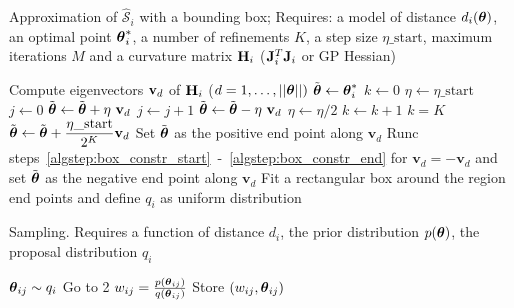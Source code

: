 \begin{algorithm}[!ht]
	\caption{Approximation of \(\mathcal{\hat{S}}_i\) with a bounding box; 
  Requires: a model of distance \(d_i(\boldsymbol{\theta})\), 
  an optimal point \(\boldsymbol{\theta}_i^*\), 
  a number of refinements \(K\), 
  a step size \(\eta\_\text{start}\), 
  maximum iterations \(M\) and 
  a curvature matrix \(\mathbf{H}_i\) (\(\mathbf{J}_i^T\mathbf{J}_i \) or GP Hessian)}\label{alg:region_construction}
	\begin{algorithmic}[1]
	\State Compute eigenvectors \(\mathbf{v}_{d}\) of \(\mathbf{H}_i\) {\scriptsize (\(d = 1,\ldots,||\boldsymbol{\theta} ||)\)}
		\State \(\Tilde{\boldsymbol{\theta}} \gets \boldsymbol{\theta}_i^*\) \label{algstep:box_constr_start}
		\State \(k \gets 0\)
		\State \(\eta \gets \eta\_\text{start}\) 
		\Repeat
          \State \(j \gets 0\)
        	\Repeat
            \State \(\Tilde{\boldsymbol{\theta}} \gets \Tilde{\boldsymbol{\theta}} + \eta \ \mathbf{v}_{d}\) 
            \State \(j \gets j + 1\)
        	 
        	\State \(\Tilde{\boldsymbol{\theta}} \gets \Tilde{\boldsymbol{\theta}} - \eta \ \mathbf{v}_{d}\)
        	\State \(\eta \gets \eta/2\) 
        	\State \(k \gets k + 1\)
      \Until \(k = K\)
       
        \State \(\Tilde{\boldsymbol{\theta}} \gets \Tilde{\boldsymbol{\theta}} + \dfrac{\eta\_{\text{start}}}{2^K} \mathbf{v}_d\) 
      \EndIf \label{algstep:box_constr_end}
    	\State Set \(\Tilde{\boldsymbol{\theta}}\) as the positive end point along \(\mathbf{v}_{d}\)
    	\State Runc steps~\ref{algstep:box_constr_start}~-~\ref{algstep:box_constr_end} for \(\mathbf{v}_{d} = - \mathbf{v}_{d}\) and set \(\Tilde{\boldsymbol{\theta}}\) as the negative end point along \(\mathbf{v}_{d}\)
	\EndFor
	\State Fit a rectangular box around the region end points and define \(q_i\) as uniform distribution
	\end{algorithmic}
\end{algorithm}



\begin{algorithm}[H]
    \centering
    \caption{Sampling. Requires a function of distance \(d_i\), the prior distribution \(p(\boldsymbol{\theta})\), the proposal distribution \(q_i\)}\label{alg:sampling_GB}
    \begin{algorithmic}[1]
      \State \(\boldsymbol{\theta}_{ij} \sim q_i\)
            \State Go to 2 
          \Else {}
            \State \(w_{ij} = \frac{p(\boldsymbol{\theta}_{ij})}{q(\boldsymbol{\theta}_{ij})}\) 
            \State Store \((w_{ij}, \boldsymbol{\theta}_{ij})\) 
          \EndIf
    \end{algorithmic}
\end{algorithm}
